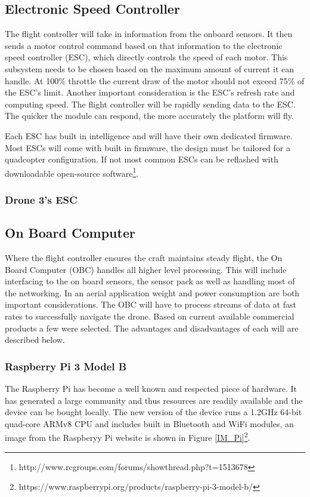 		
			\subsection{Electronic Speed Controller}
			The flight controller will take in information from the onboard sensors. It then sends a motor control command based on that information to the electronic speed controller (ESC), which directly controls the speed of each motor. This subsystem needs to be chosen based on the maximum amount of current it can handle. At 100\% throttle the current draw of the motor should not exceed 75\% of the ESC's limit. Another important consideration is the ESC's refresh rate and computing speed. The flight controller will be rapidly sending data to the ESC. The quicker the module can respond, the more accurately the platform will fly. 
			
			Each ESC has built in intelligence and will have their own dedicated firmware. Most ESCs will come with built in firmware, the design must be tailored for a quadcopter configuration. If not most common ESCs can be reflashed with downloadable open-source software\footnote{http://www.rcgroups.com/forums/showthread.php?t=1513678}.
			
				\subsubsection{Drone 3's ESC}
		
			\subsection{On Board Computer}
			Where the flight controller ensures the craft maintains steady flight, the On Board Computer (OBC) handles all higher level processing. This will include interfacing to the on board sensors, the sensor pack as well as handling most of the networking. In an aerial application weight and power consumption are both important considerations. The OBC will have to process streams of data at fast rates to successfully navigate the drone. Based on current available commercial products a few were selected. The advantages and disadvantages of each will are described below.
		
				\subsubsection{Raspberry Pi 3 Model B}
				
				The Raspberry Pi has become a well known and respected piece of hardware. It has generated a large community and thus resources are readily available and the device can be bought locally. The new version of the device runs a 1.2GHz 64-bit quad-core ARMv8 CPU and includes built in Bluetooth and WiFi modules, an image from the Raspberyy Pi website is shown in Figure \ref{IM_Pi}\footnote{https://www.raspberrypi.org/products/raspberry-pi-3-model-b/}. 
				
